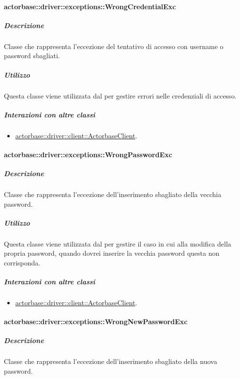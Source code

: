 \documentclass{scalatekids-article}
\begin{document}
\paragraph{actorbase::driver::exceptions::WrongCredentialExc}

\subparagraph{Descrizione}

Classe che rappresenta l'eccezione del tentativo di accesso con username o password sbagliati.

\subparagraph{Utilizzo}

Questa classe viene utilizzata dal  per gestire errori nelle credenziali di accesso.

\subparagraph{Interazioni con altre classi}

\begin{itemize}
\item \hyperref[sec:actorbase::driver::client::ActorbaseClient]{actorbase::driver::client::ActorbaseClient}.
\end{itemize}

\paragraph{actorbase::driver::exceptions::WrongPasswordExc}

\subparagraph{Descrizione}

Classe che rappresenta l'eccezione dell'inserimento sbagliato della vecchia password.

\subparagraph{Utilizzo}

Questa classe viene utilizzata dal  per gestire il caso in cui alla modifica della propria password, quando dovrei inserire la vecchia password questa non corrisponda.

\subparagraph{Interazioni con altre classi}

\begin{itemize}
\item \hyperref[sec:actorbase::driver::client::ActorbaseClient]{actorbase::driver::client::ActorbaseClient}.
\end{itemize}

\paragraph{actorbase::driver::exceptions::WrongNewPasswordExc}

\subparagraph{Descrizione}

Classe che rappresenta l'eccezione dell'inserimento sbagliato della nuova password.
\end{document}
